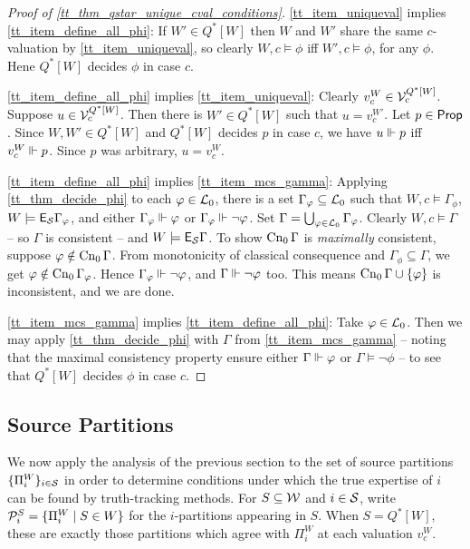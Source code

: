 \begin{proof}[Proof of \cref{tt_thm_qstar_unique_cval_conditions}]
    \cref{tt_item_uniqueval} implies \cref{tt_item_define_all_phi}: If $W' \in
    Q^*[W]$ then $W$ and $W'$ share the same $c$-valuation by
    \cref{tt_item_uniqueval}, so clearly $W, c \models \phi$ iff $W', c \models
    \phi$, for any $\phi$. Hene $Q^*[W]$ decides $\phi$ in case $c$.

    \cref{tt_item_define_all_phi} implies \cref{tt_item_uniqueval}: Clearly $v^W_c
    \in \mathcal{V}^{Q^*[W]}_c$. Suppose $u \in \mathcal{V}^{Q^*[W]}_c$. Then there is $W'
    \in Q^*[W]$ such that $u = v^{W'}_c$. Let $p \in \mathsf{Prop}$. Since $W, W'
    \in Q^*[W]$ and $Q^*[W]$ decides $p$ in case $c$, we have $u \Vdash p$
    iff $v^W_c \Vdash p$. Since $p$ was arbitrary, $u = v^W_c$.

    \cref{tt_item_define_all_phi} implies \cref{tt_item_mcs_gamma}: Applying
    \cref{tt_thm_decide_phi} to each $\varphi \in \mathcal{L}_0$, there is a set
    $\Gamma_\varphi \subseteq \mathcal{L}_0$ such that $W, c \models \Gamma_\phi$, $W
    \models \mathsf{E}_{\mathcal{S}}\Gamma_\varphi$, and either $\Gamma_\varphi \Vdash \varphi$ or
    $\Gamma_\varphi \Vdash \neg\varphi$. Set $\Gamma = \bigcup_{\varphi \in
    \mathcal{L}_0}{\Gamma_\varphi}$. Clearly $W, c \models \Gamma$ -- so $\Gamma$ is
    consistent -- and $W \models \mathsf{E}_{\mathcal{S}}\Gamma$. To show $\operatorname{Cn}_0{\Gamma}$ is
    \emph{maximally} consistent, suppose $\varphi \notin \operatorname{Cn}_0{\Gamma}$. From
    monotonicity of classical consequence and $\Gamma_\phi \subseteq \Gamma$,
    we get $\varphi \notin \operatorname{Cn}_0{\Gamma_\varphi}$. Hence $\Gamma_\varphi \Vdash
    \neg\varphi$, and $\Gamma \Vdash \neg\varphi$ too. This means
    $\operatorname{Cn}_0{\Gamma} \cup \{\varphi\}$ is inconsistent, and we are done.

    \cref{tt_item_mcs_gamma} implies \cref{tt_item_define_all_phi}: Take $\varphi \in
    \mathcal{L}_0$. Then we may apply \cref{tt_thm_decide_phi} with $\Gamma$ from
    \cref{tt_item_mcs_gamma} -- noting that the maximal consistency property
    ensure either $\Gamma \Vdash \varphi$ or $\Gamma \models \neg\phi$ -- to
    see that $Q^*[W]$ decides $\phi$ in case $c$.
\end{proof}

\subsection{Source Partitions}

We now apply the analysis of the previous section to the set of source
partitions $\{\Pi^W_i\}_{i \in \mathcal{S}}$ in order to determine conditions under
which the true expertise of $i$ can be found by truth-tracking methods.
%
For $S \subseteq \mathcal{W}$ and $i \in
\mathcal{S}$, write $\mathcal{P}^S_i = \{\Pi^W_i \mid S \in W\}$ for the $i$-partitions
appearing in $S$. When $S = Q^*[W]$, these are exactly those partitions which
agree with $\Pi^W_i$ at each valuation $v^W_c$.

